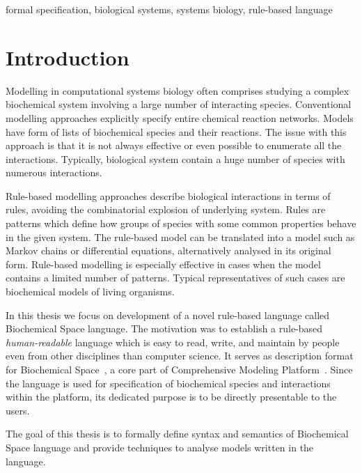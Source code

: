 \documentclass[12pt, twoside]{fithesis2} %
\begin{document}
\begin{ThesisKeyWords}
formal specification, biological systems, systems biology, rule-based language
\end{ThesisKeyWords}

\MainMatter
\tableofcontents

\chapter{Introduction}

Modelling in computational systems biology often comprises studying a complex biochemical system involving a large number of interacting species. Conventional modelling approaches explicitly specify entire chemical reaction networks. Models have form of lists of biochemical species and their reactions. The issue with this approach is that it is not always effective or even possible to enumerate all the interactions. Typically, biological system contain a huge number of species with numerous interactions.

Rule-based modelling approaches describe biological interactions in terms of rules, avoiding the combinatorial explosion of underlying system. Rules are patterns which define how groups of species with some common properties behave in the given system. The rule-based model can be translated into a model such as Markov chains or differential equations, alternatively analysed in its original form. Rule-based modelling is especially effective in cases when the model contains a limited number of patterns. Typical representatives of such cases are biochemical models of living organisms.

In this thesis we focus on development of a novel rule-based language called Biochemical Space language. The motivation was to establish a rule-based \emph{human-readable} language which is easy to read, write, and maintain by people even from other disciplines than computer science. It serves as description format for Biochemical Space~\cite{BCS}, a core part of Comprehensive Modeling Platform~\cite{cs2bio2013}. Since the language is used for specification of biochemical species and interactions within the platform, its dedicated purpose is to be directly presentable to the users.

The goal of this thesis is to formally define syntax and semantics of Biochemical Space language and provide techniques to analyse models written in the language. 
\end{document}
